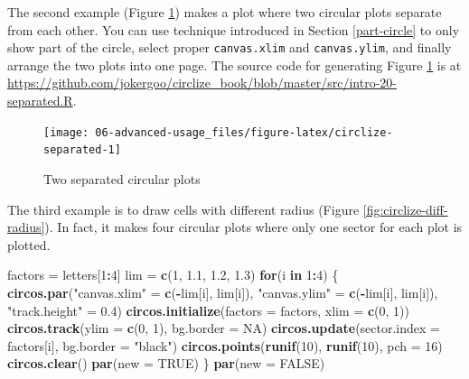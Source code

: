 \documentclass[]{book}
\newenvironment{Shaded}{\begin{snugshade}}{\end{snugshade}}
\newcommand{\KeywordTok}[1]{\textcolor[rgb]{0.13,0.29,0.53}{\textbf{#1}}}
\newcommand{\DataTypeTok}[1]{\textcolor[rgb]{0.13,0.29,0.53}{#1}}
\newcommand{\DecValTok}[1]{\textcolor[rgb]{0.00,0.00,0.81}{#1}}
\newcommand{\FloatTok}[1]{\textcolor[rgb]{0.00,0.00,0.81}{#1}}
\newcommand{\StringTok}[1]{\textcolor[rgb]{0.31,0.60,0.02}{#1}}
\newcommand{\OtherTok}[1]{\textcolor[rgb]{0.56,0.35,0.01}{#1}}
\newcommand{\ControlFlowTok}[1]{\textcolor[rgb]{0.13,0.29,0.53}{\textbf{#1}}}
\newcommand{\OperatorTok}[1]{\textcolor[rgb]{0.81,0.36,0.00}{\textbf{#1}}}
\newcommand{\NormalTok}[1]{#1}
\begin{document}
The second example (Figure \ref{fig:circlize-separated}) makes a plot
where two circular plots separate from each other. You can use technique
introduced in Section \ref{part-circle} to only show part of the circle,
select proper \texttt{canvas.xlim} and \texttt{canvas.ylim}, and finally
arrange the two plots into one page. The source code for generating
Figure \ref{fig:circlize-separated} is at
\url{https://github.com/jokergoo/circlize_book/blob/master/src/intro-20-separated.R}.

\begin{figure}

{\centering \texttt{[image: 06-advanced-usage\_files/figure-latex/circlize-separated-1]} 

}

\caption{Two separated circular plots}\label{fig:circlize-separated}
\end{figure}

The third example is to draw cells with different radius (Figure
\ref{fig:circlize-diff-radius}). In fact, it makes four circular plots
where only one sector for each plot is plotted.

\begin{Shaded}
\begin{Highlighting}[]
\NormalTok{factors =}\StringTok{ }\NormalTok{letters[}\DecValTok{1}\OperatorTok{:}\DecValTok{4}\NormalTok{]}
\NormalTok{lim =}\StringTok{ }\KeywordTok{c}\NormalTok{(}\DecValTok{1}\NormalTok{, }\FloatTok{1.1}\NormalTok{, }\FloatTok{1.2}\NormalTok{, }\FloatTok{1.3}\NormalTok{)}
\ControlFlowTok{for}\NormalTok{(i }\ControlFlowTok{in} \DecValTok{1}\OperatorTok{:}\DecValTok{4}\NormalTok{) \{}
    \KeywordTok{circos.par}\NormalTok{(}\StringTok{"canvas.xlim"}\NormalTok{ =}\StringTok{ }\KeywordTok{c}\NormalTok{(}\OperatorTok{-}\NormalTok{lim[i], lim[i]), }
        \StringTok{"canvas.ylim"}\NormalTok{ =}\StringTok{ }\KeywordTok{c}\NormalTok{(}\OperatorTok{-}\NormalTok{lim[i], lim[i]), }
        \StringTok{"track.height"}\NormalTok{ =}\StringTok{ }\FloatTok{0.4}\NormalTok{)}
    \KeywordTok{circos.initialize}\NormalTok{(}\DataTypeTok{factors =}\NormalTok{ factors, }\DataTypeTok{xlim =} \KeywordTok{c}\NormalTok{(}\DecValTok{0}\NormalTok{, }\DecValTok{1}\NormalTok{))}
    \KeywordTok{circos.track}\NormalTok{(}\DataTypeTok{ylim =} \KeywordTok{c}\NormalTok{(}\DecValTok{0}\NormalTok{, }\DecValTok{1}\NormalTok{), }\DataTypeTok{bg.border =} \OtherTok{NA}\NormalTok{)}
    \KeywordTok{circos.update}\NormalTok{(}\DataTypeTok{sector.index =}\NormalTok{ factors[i], }\DataTypeTok{bg.border =} \StringTok{"black"}\NormalTok{)}
    \KeywordTok{circos.points}\NormalTok{(}\KeywordTok{runif}\NormalTok{(}\DecValTok{10}\NormalTok{), }\KeywordTok{runif}\NormalTok{(}\DecValTok{10}\NormalTok{), }\DataTypeTok{pch =} \DecValTok{16}\NormalTok{)}
    \KeywordTok{circos.clear}\NormalTok{()}
    \KeywordTok{par}\NormalTok{(}\DataTypeTok{new =} \OtherTok{TRUE}\NormalTok{)}
\NormalTok{\}}
\KeywordTok{par}\NormalTok{(}\DataTypeTok{new =} \OtherTok{FALSE}\NormalTok{)}
\end{Highlighting}
\end{Shaded}
\end{document}

